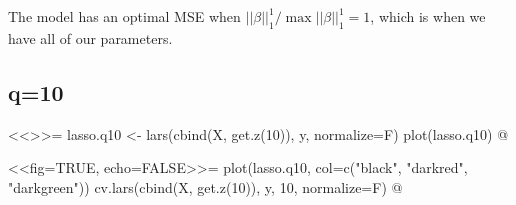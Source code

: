 The model has an optimal MSE when $||\beta||^1_1/\max ||\beta||^1_1=1$,
which is when we have all of our parameters.

\subsection{q=10}
\begin{minipage}[c]{0.45\linewidth}
<<>>=
lasso.q10 <- lars(cbind(X, get.z(10)), y, normalize=F)
plot(lasso.q10)
@
\end{minipage}
\hfill
\begin{minipage}[c]{0.5\linewidth}
<<fig=TRUE, echo=FALSE>>=
plot(lasso.q10, col=c("black", "darkred", "darkgreen"))
cv.lars(cbind(X, get.z(10)), y, 10, normalize=F)
@
\end{minipage}\\



